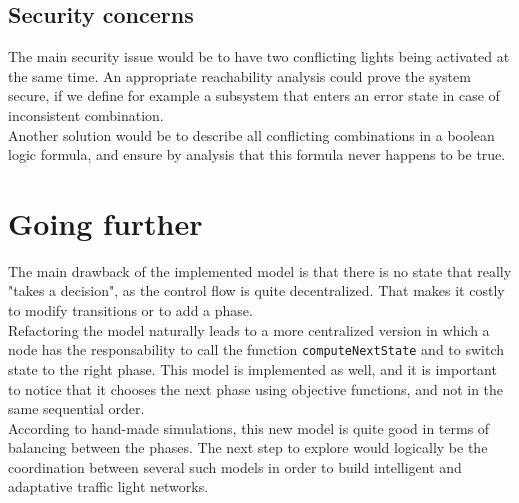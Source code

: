 \documentclass[paper=a4, fontsize=11pt]{scrartcl}
\numberwithin{figure}{section}			%
\numberwithin{table}{section}				%
\begin{document}
\subsection{Security concerns}

The main security issue would be to have two conflicting lights being activated at the same time. An appropriate reachability analysis could prove the system secure, if we define for example a subsystem that enters an error state in case of inconsistent combination.\\

Another solution would be to describe all conflicting combinations in a boolean logic formula, and ensure by analysis that this formula never happens to be true.

\section{Going further}

The main drawback of the implemented model is that there is no state that really "takes a decision", as the control flow is quite decentralized. That makes it costly to modify transitions or to add a phase.\\

Refactoring the model naturally leads to a more centralized version in which a node has the responsability to call the function \texttt{computeNextState} and to switch state to the right phase. This model is implemented as well, and it is important to notice that it chooses the next phase using objective functions, and not in the same sequential order.\\

According to hand-made simulations, this new model is quite good in terms of balancing between the phases. The next step to explore would logically be the coordination between several such models in order to build intelligent and adaptative traffic light networks.



\nocite{*}
\end{document}
